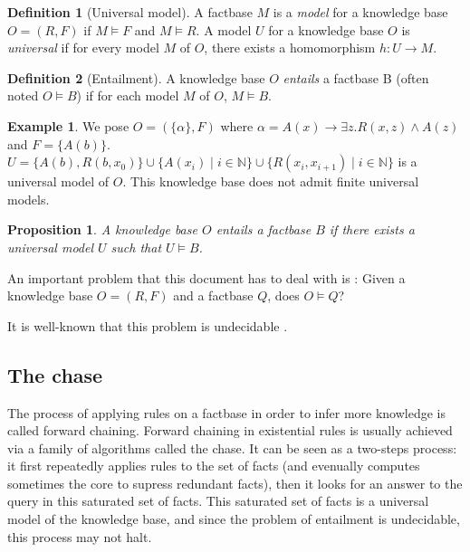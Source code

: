 \documentclass{article}
\newtheorem{proposition}{Proposition}[section]
\theoremstyle{definition}
\newtheorem{definition}{Definition}[section]
\newtheorem{example}{Example}[section]
\theoremstyle{remark}
\def \N {\mathbb N}
\begin{document}
\begin{definition}[Universal model]
A factbase $M$ is a \emph{model} for a knowledge base $O = (R,F)$ if $M \models F$ and $M \models R$.  A model $U$ for a knowledge base $O$ is \emph{universal} if for
every model $M$ of $O$, there exists a homomorphism $h : U \to M$.
\end{definition}

\begin{definition}[Entailment]
A knowledge base $O$ \emph{entails} a factbase B (often noted $O \models B$) if for each model $M$ of $O$, $M \models B$.
\end{definition}

\begin{example} We pose $O = (\{\alpha\},F)$ where $\alpha = A(x) \rightarrow \exists z.R(x,z) \wedge A(z)$ and $F = \{A(b)\}$. $U = \{A(b),R(b,x_0)\}\cup \{A(x_i)\mid i \in \N\}\cup \{R(x_i,x_{i+1}) \mid i \in \N\}$ is a universal model of $O$. This knowledge base does not admit finite universal models.
\end{example}


\begin{proposition}
A knowledge base $O$ entails a factbase $B$ if there exists a universal model $U$ such that $U \models B$.
\end{proposition}

An important problem that this document has to deal with is : Given a knowledge base $O=(R,F)$ and a factbase $Q$,  does $O \models Q$?

It  is  well-known  that  this  problem  is  undecidable \cite{NP}.



\subsection{The chase}

The process of applying rules on a factbase in order to infer more knowledge is called forward chaining.   Forward  chaining  in  existential  rules  is  usually achieved  via  a  family  of  algorithms  called the  chase. It can be seen as a two-steps process: it first repeatedly applies rules to the set of facts (and evenually computes sometimes the core to supress redundant facts), then it looks for an answer to the query in this saturated set of facts. This saturated set of facts is a universal model of the knowledge base, and since the problem of entailment is undecidable, this process may not halt.
\end{document}
